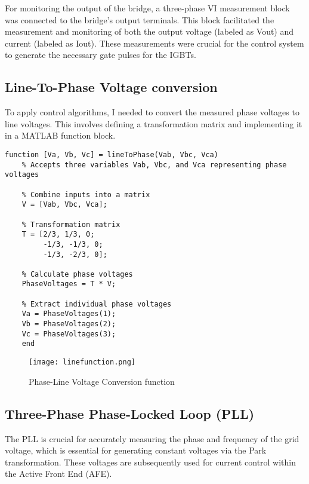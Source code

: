 For monitoring the output of the bridge, a three-phase VI measurement block was
connected to the bridge's output terminals. This block facilitated the
measurement and monitoring of both the output voltage (labeled as Vout) and
current (labeled as Iout). These measurements were crucial for the control
system to generate the necessary gate pulses for the IGBTs.

\subsection{Line-To-Phase Voltage conversion}
To apply control algorithms, I needed to convert the measured phase voltages to
line voltages. This involves defining a transformation matrix and implementing
it in a MATLAB function block.

\begin{lstlisting}[style=MATLAB, caption={Phase to Line voltage transformation function}, label={lst:matlab}]
    function [Va, Vb, Vc] = lineToPhase(Vab, Vbc, Vca)
    % Accepts three variables Vab, Vbc, and Vca representing phase voltages
    
    % Combine inputs into a matrix
    V = [Vab, Vbc, Vca];
    
    % Transformation matrix
    T = [2/3, 1/3, 0;
         -1/3, -1/3, 0;
         -1/3, -2/3, 0];
    
    % Calculate phase voltages
    PhaseVoltages = T * V;
    
    % Extract individual phase voltages
    Va = PhaseVoltages(1);
    Vb = PhaseVoltages(2);
    Vc = PhaseVoltages(3);
    end
\end{lstlisting}

\begin{figure}[h]
    \centering
    \texttt{[image: linefunction.png]}
    \caption{Phase-Line Voltage Conversion function}
    \label{fig:phase}
\end{figure}

\subsection{Three-Phase Phase-Locked Loop (PLL)}
The PLL is crucial for accurately measuring the phase and frequency of the grid
voltage, which is essential for generating constant voltages via the Park
transformation. These voltages are subsequently used for current control within
the Active Front End (AFE).\\

